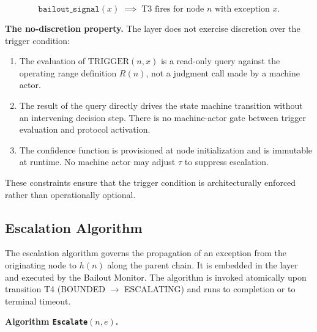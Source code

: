 \begin{equation}
\texttt{bailout\_signal}(x) \;\implies\; \text{T3 fires for node } n \text{ with exception } x. \tag{TC-secondary}
\end{equation}

\bigskip
\noindent\textbf{The no-discretion property.} The \bounds{} layer does not exercise discretion over the trigger condition:

\begin{enumerate}
    \item The evaluation of $\text{TRIGGER}(n, x)$ is a read-only query against the operating range definition $R(n)$, not a judgment call made by a machine actor.
    \item The result of the query directly drives the state machine transition without an intervening decision step. There is no machine-actor gate between trigger evaluation and protocol activation.
    \item The confidence function is provisioned at node initialization and is immutable at runtime. No machine actor may adjust $\tau$ to suppress escalation.
\end{enumerate}

These constraints ensure that the trigger condition is architecturally enforced rather than operationally optional.

\subsection{Escalation Algorithm}\label{sec:escalation-algorithm}

The escalation algorithm governs the propagation of an exception from the originating node to $h(n)$ along the parent chain. It is embedded in the \fact{} layer and executed by the Bailout Monitor. The algorithm is invoked atomically upon transition T4 (BOUNDED $\rightarrow$ ESCALATING) and runs to completion or to terminal timeout.

\bigskip
\noindent\textbf{Algorithm \texttt{Escalate}$(n, e)$.}

